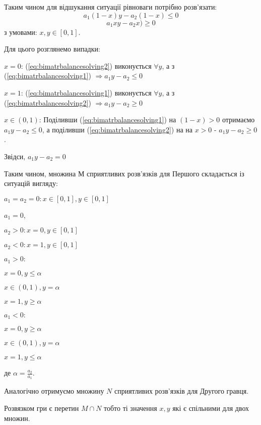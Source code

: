 \documentclass[12pt,a4paper]{book}
\newenvironment{slim_enumerate}{
\begin{enumerate}
  \setlength{\itemsep}{1pt}
  \setlength{\parskip}{0pt}
  \setlength{\parsep}{0pt}}
{\end{enumerate}}
\newenvironment{slim_itemize}{
\begin{itemize}
  \setlength{\itemsep}{1pt}
  \setlength{\parskip}{0pt}
  \setlength{\parsep}{0pt}}
{\end{itemize}}
\begin{document}
Таким чином для відшукання ситуації рівноваги потрібно розв’язати:
\begin{equation} a_1(1-x)y - a_2(1-x) \le 0 \label{eq:bimatrbalancesolving1} \end{equation}
\begin{equation} a_1xy - a_2x) \ge 0 \label{eq:bimatrbalancesolving2} \end{equation}
з умовами: $x,y \in [0,1]$.

Для цього розглянемо випадки:
\begin{slim_enumerate}
  \item $x=0$: (\ref{eq:bimatrbalancesolving2}) виконується $\forall y$, а з (\ref{eq:bimatrbalancesolving1}) $\Rightarrow a_1 y - a_2 \le 0$
  \item $x=1$: (\ref{eq:bimatrbalancesolving1}) виконується $\forall y$, а з (\ref{eq:bimatrbalancesolving2}) $\Rightarrow a_1 y - a_2 \ge 0$
  \item $x \in (0,1)$: Поділивши (\ref{eq:bimatrbalancesolving1}) на $(1-x)>0$ отримаємо $a_1 y - a_2 \le 0$, а поділивши (\ref{eq:bimatrbalancesolving2}) на на $x>0$ - $a_1 y - a_2 \ge 0$.

Звідси, $a_1 y - a_2 = 0$
\end{slim_enumerate}

Таким чином, множина $М$ сприятливих розв’язків для Першого складається із ситуацій вигляду:
\begin{slim_itemize}
  \item $a_1=a_2=0: x \in [0,1], y \in [0,1]$
  \item $a_1=0$,
  \begin{slim_enumerate}
    \item $a_2>0: x=0, y \in [0,1]$
    \item $a_2<0: x=1, y \in [0,1]$
  \end{slim_enumerate}
    \item $a_1>0:$
    \begin{slim_itemize}
      \item $x=0, y \le \alpha$
      \item $x \in (0,1), y=\alpha$
      \item $x=1, y \ge \alpha$
    \end{slim_itemize}
    \item $a_1<0:$
    \begin{slim_itemize}
      \item $x=0, y \ge \alpha$
      \item $x \in (0,1), y=\alpha$
      \item $x=1, y \le \alpha$
    \end{slim_itemize}
\end{slim_itemize}
де $\displaystyle \alpha = \frac{a_2}{a_1}$.

Аналогічно отримуємо множину $N$ сприятливих розв’язків для Другого гравця.

Розвязком гри є перетин $M \cap N$ тобто ті значення $x,y$ які є спільними для двох множин.
\end{document}
